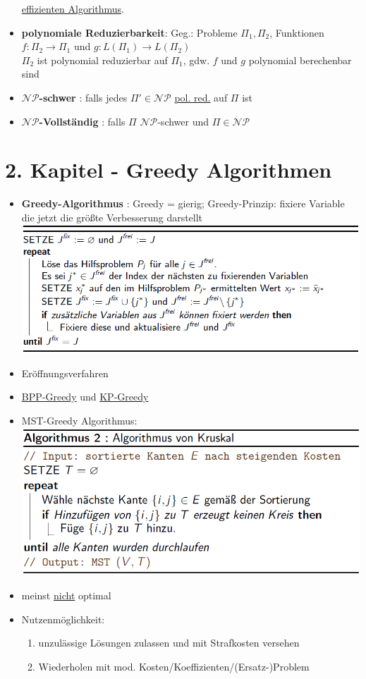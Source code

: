 \documentclass[12pt]{article}
\begin{document}
\begin{itemize}
			\hyperref[effizienter Algorithmus]{effizienten Algorithmus}.
		\item \textbf{polynomiale Reduzierbarkeit}\label{polyRed}: 
			Geg.: Probleme $\Pi_1, \Pi_2$, Funktionen $f:\Pi_2\rightarrow\Pi_1$ und $g:L(\Pi_1)\rightarrow L(\Pi_2)$\\
			$\Pi_2$ ist polynomial reduzierbar auf $\Pi_1$, gdw. $f$ und $g$ polynomial berechenbar sind
		\item \textbf{$\mathcal{NP}$-schwer} \label{NPschwer}: falls jedes $\Pi'\in\mathcal{NP}$ \hyperref[polyRed]{pol. red.} auf $\Pi$ ist
		\item \textbf{$\mathcal{NP}$-Vollständig} \label{NPvoll}: falls $\Pi$ $\mathcal{NP}$-schwer und $\Pi\in\mathcal{NP}$
	\end{itemize}

	\section{2. Kapitel - Greedy Algorithmen}
		\begin{itemize}
			\item \textbf{Greedy-Algorithmus} \label{greedy}: Greedy = gierig; Greedy-Prinzip: fixiere Variable die jetzt die größte Verbesserung darstellt\\
			\includegraphics[scale =0.6]{AllgGreedy}
			\item Eröffnungsverfahren
			\item \hyperref[BPGreedy]{BPP-Greedy} und \hyperref[KPGreedy]{KP-Greedy}
			\item MST-Greedy Algorithmus: \\
				\includegraphics[scale=0.6]{KruskalGreedy}
			\item meinst \underline{nicht} optimal
			\item Nutzenmöglichkeit: \begin{enumerate}
					\item unzulässige Lösungen zulassen und mit Strafkosten versehen
					\item Wiederholen mit mod. Kosten/Koeffizienten/(Ersatz-)Problem
				\end{enumerate}
		\end{itemize}
\end{document}
